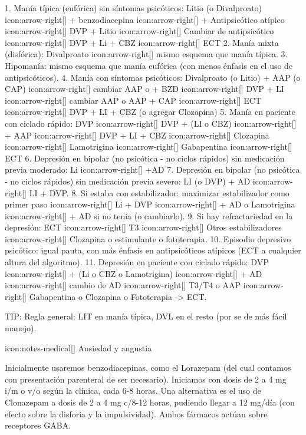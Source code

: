 \documentclass[encares.tex]{subfiles}
\begin{document}
1. Manía típica (eufórica) sin síntomas psicóticos: Litio (o Divalproato) icon:arrow-right[] + benzodiacepina icon:arrow-right[] + Antipsicótico atípico icon:arrow-right[] DVP + Litio icon:arrow-right[] Cambiar de antipsicótico icon:arrow-right[] DVP + Li + CBZ icon:arrow-right[] ECT
2. Manía mixta (disfórica): Divalproato icon:arrow-right[] mismo esquema que manía típica.
3. Hipomanía: mismo esquema que manía eufórica (con menos énfasis en el uso de antipsicóticos).
4. Manía con síntomas psicóticos: Divalproato (o Litio) + AAP (o CAP) icon:arrow-right[] cambiar AAP o + BZD icon:arrow-right[] DVP + LI icon:arrow-right[] cambiar AAP o AAP + CAP icon:arrow-right[] ECT icon:arrow-right[] DVP + LI + CBZ (o agregar Clozapina)
5. Manía en paciente con ciclado rápido: DVP icon:arrow-right[] DVP + (LI o CBZ) icon:arrow-right[] + AAP icon:arrow-right[] DVP + LI + CBZ icon:arrow-right[] Clozapina icon:arrow-right[] Lamotrigina icon:arrow-right[] Gabapentina icon:arrow-right[] ECT
6. Depresión en bipolar (no psicótica - no ciclos rápidos) sin medicación previa moderado: Li icon:arrow-right[] +AD
7. Depresión en bipolar (no psicótica - no ciclos rápidos) sin medicación previa severo: LI (o DVP) + AD icon:arrow-right[] LI + DVP.
8. Si estaba con estabilizador: maximizar estabilizador como primer paso icon:arrow-right[] Li + DVP icon:arrow-right[] + AD o Lamotrigina icon:arrow-right[] + AD si no tenía (o cambiarlo).
9. Si hay refractariedad en la depresión: ECT icon:arrow-right[] T3 icon:arrow-right[] Otros estabilizadores icon:arrow-right[] Clozapina o estimulante o fototerapia.
10. Episodio depresivo psicótico: igual pauta, con más énfasis en antipsicóticos atípicos (ECT a cualquier altura del algoritmo).
11. Depresión en paciente con ciclado rápido: DVP icon:arrow-right[] + (Li o CBZ o Lamotrigina) icon:arrow-right[] + AD icon:arrow-right[] cambio de AD icon:arrow-right[] T3/T4 o AAP icon:arrow-right[] Gabapentina o Clozapina o Fototerapia -> ECT.

TIP: Regla general: LIT en manía típica, DVL en el resto (por se de más fácil manejo).

icon:notes-medical[] Ansiedad y angustia

Inicialmente usaremos benzodiacepinas, como el Lorazepam (del cual contamos con presentación parenteral de ser necesario). Iniciamos con dosis de 2 a 4 mg i/m o v/o según la clínica, cada 6-8 horas. Una alternativa es el uso de Clonazepam a dosis de 2 a 4 mg c/8-12 horas, pudiendo llegar a 12 mg/día (con efecto sobre la disforia y la impulsividad). Ambos fármacos actúan sobre receptores GABA.
\end{document}
